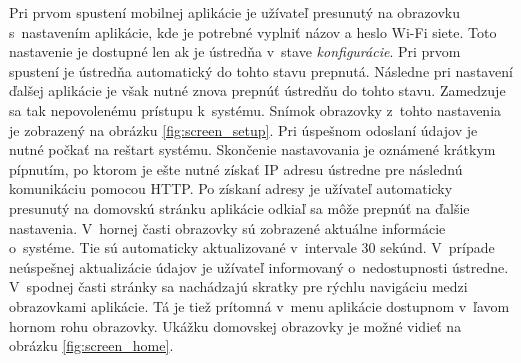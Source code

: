 Pri prvom spustení mobilnej aplikácie je užívateľ presunutý na obrazovku s~nastavením aplikácie, kde je potrebné vyplniť názov a heslo Wi-Fi siete. Toto nastavenie je dostupné len ak je ústredňa v~stave \textit{konfigurácie}. Pri prvom spustení je ústredňa automatický do tohto stavu prepnutá. Následne pri nastavení ďalšej aplikácie je však nutné znova prepnúť ústredňu do tohto stavu. Zamedzuje sa tak nepovolenému prístupu k~systému. Snímok obrazovky z~tohto nastavenia je zobrazený na obrázku \ref{fig:screen_setup}. Pri úspešnom odoslaní údajov je nutné počkať na reštart systému. Skončenie nastavovania je oznámené krátkym pípnutím, po ktorom je ešte nutné získať IP adresu ústredne pre následnú komunikáciu pomocou HTTP. Po získaní adresy je užívateľ automaticky presunutý na domovskú stránku aplikácie odkiaľ sa môže prepnúť na ďalšie nastavenia. V~hornej časti obrazovky sú zobrazené aktuálne informácie o~systéme. Tie sú automaticky aktualizované v~intervale 30 sekúnd. V~prípade neúspešnej aktualizácie údajov je užívateľ informovaný o~nedostupnosti ústredne. V~spodnej časti stránky sa nachádzajú skratky pre rýchlu navigáciu medzi obrazovkami aplikácie. Tá je tiež prítomná v~menu aplikácie dostupnom v~ľavom hornom rohu obrazovky. Ukážku domovskej obrazovky je možné vidieť na obrázku \ref{fig:screen_home}.

